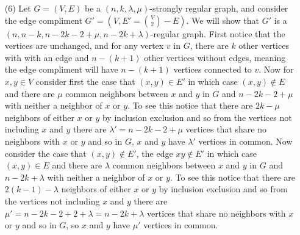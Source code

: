 \documentclass[12pt]{amsart}
\begin{document}
\begin{itemize}
\item[(6)] %
Let $G=(V,E)$ be a $(n,k,\lambda,\mu)$-strongly regular graph, and consider the edge compliment $G'=(V,E'={V\choose 2}-E)$. We will show that $G'$ is a $(n,n-k,n-2k-2+\mu,n-2k+\lambda)$-regular graph. First notice that the vertices are unchanged, and for any vertex $v$ in $G$, there are $k$ other vertices with with an edge and $n-(k+1)$ other vertices without edges, meaning the edge compliment will have $n-(k+1)$ vertices connected to $v$. Now for $x,y\in V$ consider first the case that $(x,y)\in E'$ in which case $(x,y)\not\in E$ and there are $\mu$ common neighbors between $x$ and $y$ in $G$ and $n-2k-2+\mu$ with neither a neighbor of $x$ or $y$. To see this notice that there are $2k-\mu$ neighbors of either $x$ or $y$ by inclusion exclusion and so from the vertices not including $x$ and $y$ there are $\lambda'=n-2k-2+\mu$ vertices that share no neighbors with $x$ or $y$ and so in $G$, $x$ and $y$ have $\lambda'$ vertices in common. Now consider the case that $(x,y)\not\in E'$, the edge $xy\not\in E'$ in which case $(x,y)\in E$ and there are $\lambda$ common neighbors between $x$ and $y$ in $G$ and $n-2k+\lambda$ with neither a neighbor of $x$ or $y$. To see this notice that there are $2(k-1)-\lambda$ neighbors of either $x$ or $y$ by inclusion exclusion and so from the vertices not including $x$ and $y$ there are $\mu'=n-2k-2+2+\lambda=n-2k+\lambda$ vertices that share no neighbors with $x$ or $y$ and so in $G$, so $x$ and $y$ have $\mu'$ vertices in common.\\


\end{itemize}
\end{document}
